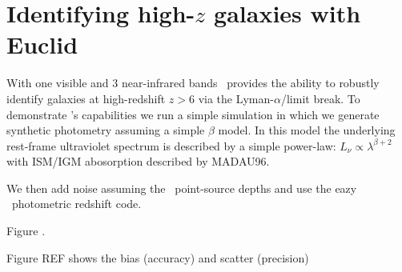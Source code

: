 

\section{Identifying high-$z$ galaxies with Euclid}

With one visible and 3 near-infrared bands \euclid\ provides the ability to robustly identify galaxies at high-redshift $z>6$ via the Lyman-$\alpha$/limit break. To demonstrate \euclid's capabilities we run a simple simulation in which we generate synthetic photometry assuming a simple $\beta$ model. In this model the underlying rest-frame ultraviolet spectrum is described by a simple power-law: $L_{\nu}\propto \lambda^{\beta+2}$ with ISM/IGM abosorption described by MADAU96.

We then add noise assuming the \euclid\ point-source depths and use the {\sc eazy} \insref\ photometric redshift code.



Figure \insref.

Figure REF shows the bias (accuracy) and scatter (precision)
